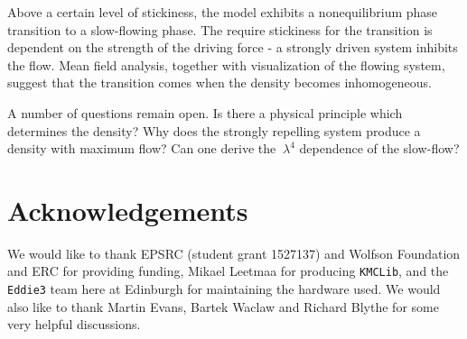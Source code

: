 \documentclass[
reprint, amsmath,amssymb,
]{revtex4-1}
\begin{document}
Above a certain level of stickiness, the model exhibits a
nonequilibrium phase transition to a slow-flowing phase.  The require
stickiness for the transition is dependent on the strength of the
driving force - a strongly driven system inhibits the flow.  Mean field
analysis, together with visualization of the flowing system, suggest
that the transition comes when the density becomes inhomogeneous.

A number of questions remain open. Is there a physical principle which
determines the density?  Why does the strongly repelling system
produce a density with maximum flow?  Can one derive the $~\lambda^4$
dependence of the slow-flow?

\section*{Acknowledgements}
We would like to thank EPSRC (student grant 1527137) and Wolfson
Foundation and ERC for providing funding, Mikael Leetmaa for producing
\texttt{KMCLib}, and the \texttt{Eddie3} team here at Edinburgh for
maintaining the hardware used.  We would also like to thank Martin
Evans, Bartek Waclaw and Richard Blythe for some very helpful
discussions.


\end{document}
